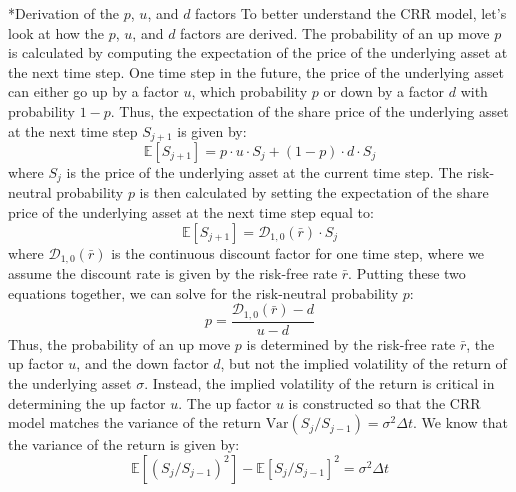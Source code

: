 \documentclass[11pt]{article}
\makeatletter
\theoremstyle{definition}
\renewcommand\subsubsection{\@startsection
	{subsubsection}{2}{0mm}
	{-0.05in}
	{-0.5\baselineskip}
	{\normalfont\normalsize\itshape\bfseries}}
\makeatother
\begin{document}
\subsubsection*{Derivation of the $p$, $u$, and $d$ factors}
To better understand the CRR model, let's look at how the $p$, $u$, and $d$ factors are derived. The probability
of an up move $p$ is calculated by computing the expectation of the price of the underlying asset at the next time step.
One time step in the future, the price of the underlying asset can either go up by a factor $u$, which probability $p$ or down by a factor $d$
with probability $1-p$. Thus, the expectation of the share price of the underlying asset at the next time step $S_{j+1}$ is given by:
\begin{equation*}
	\mathbb{E}[S_{j+1}] = p\cdot{u}\cdot{S}_{j} + (1-p)\cdot{d}\cdot{S_{j}}
\end{equation*}
where $S_{j}$ is the price of the underlying asset at the current time step. 
The risk-neutral probability $p$ is then calculated by setting the expectation of the share price of the underlying asset at the next time step equal to: 
\begin{equation*}
	\mathbb{E}[S_{j+1}] = \mathcal{D}_{1,0}(\bar{r})\cdot{S}_{j}
\end{equation*}
where $\mathcal{D}_{1,0}(\bar{r})$ is the continuous discount factor for one time step, where we assume the discount rate is given by the risk-free rate $\bar{r}$.
Putting these two equations together, we can solve for the risk-neutral probability $p$:
\begin{equation*}
	p = \frac{\mathcal{D}_{1,0}(\bar{r}) - d}{u - d}
\end{equation*}
Thus, the probability of an up move $p$ is determined by the risk-free rate $\bar{r}$, the up factor $u$, and the down factor $d$, 
but not the implied volatility of the return of the underlying asset $\sigma$.  
Instead, the implied volatility of the return is critical in determining the up factor $u$.
The up factor $u$ is constructed so that the CRR model matches the variance of the return $\text{Var}(S_{j}/S_{j-1})=\sigma^{2}\Delta{t}$.
We know that the variance of the return is given by:
\begin{equation}
\mathbb{E}\left[(S_{j}/S_{j-1})^2\right] - \mathbb{E}\left[S_{j}/S_{j-1}\right]^{2} = \sigma^{2}\Delta{t}
\end{equation}







\clearpage


\clearpage
\printindex
\end{document}
